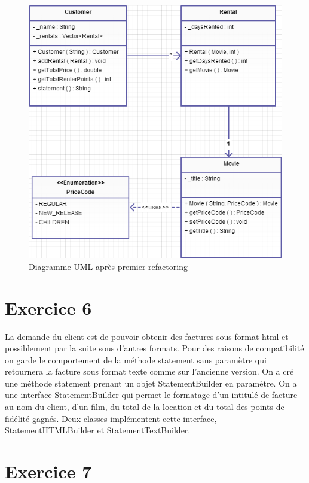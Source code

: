 \documentclass[%
a4paper,
11pt
]{article}
\begin{document}
\begin{figure}[!ht]
    \center
    \includegraphics[width = \textwidth]{imgs/Diagramme2.png}
    \caption{Diagramme UML après premier refactoring}
\end{figure}

\section*{Exercice 6}

La demande du client est de pouvoir obtenir des factures sous format html et possiblement par la suite sous d'autres formats. Pour des raisons de compatibilité on garde le comportement de la méthode statement sans paramètre qui retournera la facture sous format texte comme sur l'ancienne version. On a cré une méthode statement prenant un objet StatementBuilder en paramètre. On a une interface StatementBuilder qui permet le formatage d'un intitulé de facture au nom du client, d'un film, du total de la location et du total des points de fidélité gagnés. Deux classes implémentent cette interface, StatementHTMLBuilder et StatementTextBuilder.
 
\section*{Exercice 7}
\end{document}
